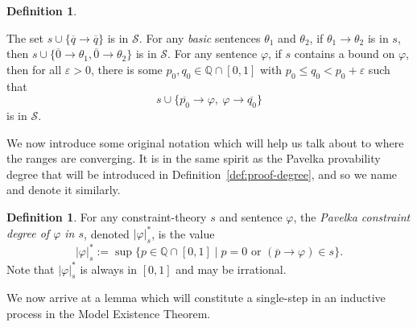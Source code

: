 \documentclass{amsart}
\theoremstyle{definition}
\newtheorem{definition}[theorem]{Definition}
\numberwithin{equation}{theorem}
\renewcommand{\phi}{\varphi}
\renewcommand{\epsilon}{\varepsilon}
\newcommand{\Q}{\mathbb{Q}}
\newcommand{\where}{\mid}
\newcommand{\rat}[1]{{\overline{#1}}}
\newcommand{\narrow}[1]{\xrightarrow{#1}}
\renewcommand{\to}{\narrow{}}
\begin{document}
\begin{definition}
\begin{enumerate}[label=(CP\arabic*)]
  \litem{$\Q$-Rule}\label{itm:cp-rule-q}
    The set $s\cup\{\rat q\to\rat q\}$ is in $\mathscr{S}$.
  \label{itm:cp-rule-intro}
    For any \emph{basic} sentences $\theta_1$ and $\theta_2$, if $\theta_1\to\theta_2$ is in $s$, then $s\cup\{\rat 0\to\theta_1,\rat 0\to\theta_2\}$ is in $\mathscr{S}$.
  \label{itm:cp-rule-narrowing}
    For any sentence $\phi$, if $s$ contains a bound on $\phi$, then for all $\epsilon>0$, there is some $p_0,q_0\in\Q\cap[0,1]$ with $p_0\leq q_0< p_0+\epsilon$ such that
    \[
      s\cup\{\rat{p_0}\to\phi,\ \phi\to\rat{q_0}\}
    \]
    is in $\mathscr{S}$.
	\end{enumerate}
\end{definition}

We now introduce some original notation which will help us talk about to where the ranges are converging.
It is in the same spirit as the Pavelka provability degree that will be introduced in Definition~\ref{def:proof-degree}, and so we name and denote it similarly.
\begin{definition}
  For any constraint-theory $s$ and sentence $\phi$, the \emph{Pavelka constraint degree of $\phi$ in $s$}, denoted $|\phi|^*_s$, is the value
  \[
    |\phi|^*_s:=\sup\{p\in\Q\cap[0,1]\where\text{$p=0$ or $(\rat p\to\phi)\in s$}\}.
  \]
  Note that $|\phi|^*_s$ is always in $[0,1]$ and may be irrational.
\end{definition}
We now arrive at a lemma which will constitute a single-step in an inductive process in the Model Existence Theorem.
\end{document}
